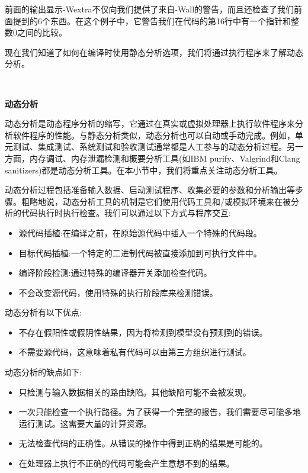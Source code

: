 前面的输出显示-Wextra不仅向我们提供了来自-Wall的警告，而且还检查了我们前面提到的6个东西。在这个例子中，它警告我们在代码的第16行中有一个指针和整数0之间的比较。 \par
现在我们知道了如何在编译时使用静态分析选项，我们将通过执行程序来了解动态分析。 \par

\noindent\textbf{}\ \par
\textbf{动态分析} \ \par
动态分析是动态程序分析的缩写，它通过在真实或虚拟处理器上执行软件程序来分析软件程序的性能。与静态分析类似，动态分析也可以自动或手动完成。例如，单元测试、集成测试、系统测试和验收测试通常都是人工参与的动态分析过程。另一方面，内存调试、内存泄漏检测和概要分析工具(如IBM purify、Valgrind和Clang sanitizers)都是动态分析工具。在本小节中，我们将重点关注动态分析工具。 \par
动态分析过程包括准备输入数据、启动测试程序、收集必要的参数和分析输出等步骤。粗略地说，动态分析工具的机制是它们使用代码工具和/或模拟环境来在被分析的代码执行时执行检查。我们可以通过以下方式与程序交互: \par

\begin{itemize}
	\item 源代码插植:在编译之前，在原始源代码中插入一个特殊的代码段。
	\item 目标代码插植:一个特定的二进制代码被直接添加到可执行文件中。
	\item 编译阶段检测:通过特殊的编译器开关添加检查代码。
	\item 不会改变源代码，使用特殊的执行阶段库来检测错误。
\end{itemize}

动态分析有以下优点:
\begin{itemize}
	\item 不存在假阳性或假阴性结果，因为将检测到模型没有预测到的错误。
	\item 不需要源代码，这意味着私有代码可以由第三方组织进行测试。
\end{itemize}

动态分析的缺点如下:
\begin{itemize}
	\item 只检测与输入数据相关的路由缺陷。其他缺陷可能不会被发现。
	\item 一次只能检查一个执行路径。为了获得一个完整的报告，我们需要尽可能多地运行测试。这需要大量的计算资源。
	\item 无法检查代码的正确性。从错误的操作中得到正确的结果是可能的。
	\item 在处理器上执行不正确的代码可能会产生意想不到的结果。
\end{itemize}

